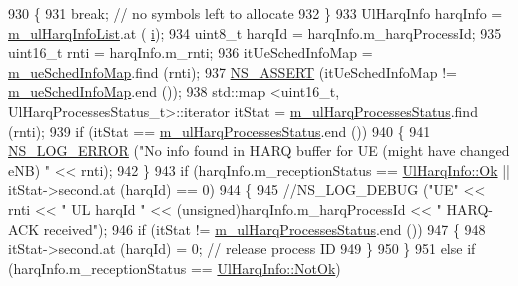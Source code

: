 \begin{DoxyCode}
930                         \{
931                                 \textcolor{keywordflow}{break};  \textcolor{comment}{// no symbols left to allocate}
932                         \}
933                         UlHarqInfo harqInfo = \hyperlink{classns3_1_1MmWaveFlexTtiMaxWeightMacScheduler_ad0c6ce6c255be4838fe693c7c1934598}{m\_ulHarqInfoList}.at (
      \hyperlink{bernuolliDistribution_8m_a6f6ccfcf58b31cb6412107d9d5281426}{i});
934                         uint8\_t harqId = harqInfo.m\_harqProcessId;
935                         uint16\_t rnti = harqInfo.m\_rnti;
936                         itUeSchedInfoMap = \hyperlink{classns3_1_1MmWaveFlexTtiMaxWeightMacScheduler_a6c90cb4d10b9d6347f7447508f5bebfe}{m\_ueSchedInfoMap}.find (rnti);
937                         \hyperlink{assert_8h_a6dccdb0de9b252f60088ce281c49d052}{NS\_ASSERT} (itUeSchedInfoMap != \hyperlink{classns3_1_1MmWaveFlexTtiMaxWeightMacScheduler_a6c90cb4d10b9d6347f7447508f5bebfe}{m\_ueSchedInfoMap}.end ());
938                         std::map <uint16\_t, UlHarqProcessesStatus\_t>::iterator itStat = 
      \hyperlink{classns3_1_1MmWaveFlexTtiMaxWeightMacScheduler_aeff65837d6604471dd667bfe89240de2}{m\_ulHarqProcessesStatus}.find (rnti);
939                         \textcolor{keywordflow}{if} (itStat == \hyperlink{classns3_1_1MmWaveFlexTtiMaxWeightMacScheduler_aeff65837d6604471dd667bfe89240de2}{m\_ulHarqProcessesStatus}.end ())
940                         \{
941                                 \hyperlink{group__logging_ga0261a8db1d4ac5f79417d117634fd455}{NS\_LOG\_ERROR} (\textcolor{stringliteral}{"No info found in HARQ buffer for UE (might have
       changed eNB) "} << rnti);
942                         \}
943                         \textcolor{keywordflow}{if} (harqInfo.m\_receptionStatus == \hyperlink{structns3_1_1UlHarqInfo_af1ea9a1ce02c9b4a551ac978484a4336ad61a738c75abe251c05daa2461ecf308}{UlHarqInfo::Ok} || itStat->second.at
       (harqId) == 0)
944                         \{
945                                 \textcolor{comment}{//NS\_LOG\_DEBUG ("UE" << rnti << " UL harqId " <<
       (unsigned)harqInfo.m\_harqProcessId << " HARQ-ACK received");}
946                                 \textcolor{keywordflow}{if} (itStat != \hyperlink{classns3_1_1MmWaveFlexTtiMaxWeightMacScheduler_aeff65837d6604471dd667bfe89240de2}{m\_ulHarqProcessesStatus}.end ())
947                                 \{
948                                         itStat->second.at (harqId) = 0;  \textcolor{comment}{// release process ID}
949                                 \}
950                         \}
951                         \textcolor{keywordflow}{else} \textcolor{keywordflow}{if} (harqInfo.m\_receptionStatus == \hyperlink{structns3_1_1UlHarqInfo_af1ea9a1ce02c9b4a551ac978484a4336a488db5f30de0c73647fed90c4a994a83}{UlHarqInfo::NotOk})

\end{DoxyCode}
